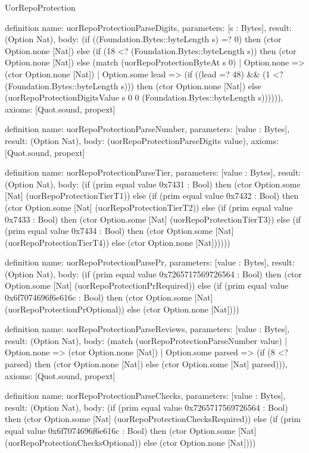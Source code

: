 \begin{lexlean}{UorRepoProtection}
\begin{semanticmodule}
definition{
  name: uorRepoProtectionParseDigits,
  parameters: [s : Bytes],
  result: (Option Nat),
  body: (if ((Foundation.Bytes::byteLength s) =? 0) then (ctor Option.none [Nat]) else (if (18 <? (Foundation.Bytes::byteLength s)) then (ctor Option.none [Nat]) else (match (uorRepoProtectionByteAt s 0)
    | Option.none => (ctor Option.none [Nat])
    | Option.some lead => (if ((lead =? 48) && (1 <? (Foundation.Bytes::byteLength s))) then (ctor Option.none [Nat]) else (uorRepoProtectionDigitsValue s 0 0 (Foundation.Bytes::byteLength s)))))),
  axioms: [Quot.sound, propext]
}

definition{
  name: uorRepoProtectionParseNumber,
  parameters: [value : Bytes],
  result: (Option Nat),
  body: (uorRepoProtectionParseDigits value),
  axioms: [Quot.sound, propext]
}

definition{
  name: uorRepoProtectionParseTier,
  parameters: [value : Bytes],
  result: (Option Nat),
  body: (if (prim equal value 0x7431 : Bool) then (ctor Option.some [Nat] (uorRepoProtectionTierT1)) else (if (prim equal value 0x7432 : Bool) then (ctor Option.some [Nat] (uorRepoProtectionTierT2)) else (if (prim equal value 0x7433 : Bool) then (ctor Option.some [Nat] (uorRepoProtectionTierT3)) else (if (prim equal value 0x7434 : Bool) then (ctor Option.some [Nat] (uorRepoProtectionTierT4)) else (ctor Option.none [Nat])))))
}

definition{
  name: uorRepoProtectionParsePr,
  parameters: [value : Bytes],
  result: (Option Nat),
  body: (if (prim equal value 0x7265717569726564 : Bool) then (ctor Option.some [Nat] (uorRepoProtectionPrRequired)) else (if (prim equal value 0x6f7074696f6e616c : Bool) then (ctor Option.some [Nat] (uorRepoProtectionPrOptional)) else (ctor Option.none [Nat])))
}

definition{
  name: uorRepoProtectionParseReviews,
  parameters: [value : Bytes],
  result: (Option Nat),
  body: (match (uorRepoProtectionParseNumber value)
    | Option.none => (ctor Option.none [Nat])
    | Option.some parsed => (if (8 <? parsed) then (ctor Option.none [Nat]) else (ctor Option.some [Nat] parsed))),
  axioms: [Quot.sound, propext]
}

definition{
  name: uorRepoProtectionParseChecks,
  parameters: [value : Bytes],
  result: (Option Nat),
  body: (if (prim equal value 0x7265717569726564 : Bool) then (ctor Option.some [Nat] (uorRepoProtectionChecksRequired)) else (if (prim equal value 0x6f7074696f6e616c : Bool) then (ctor Option.some [Nat] (uorRepoProtectionChecksOptional)) else (ctor Option.none [Nat])))
}


\end{semanticmodule}
\end{lexlean}
